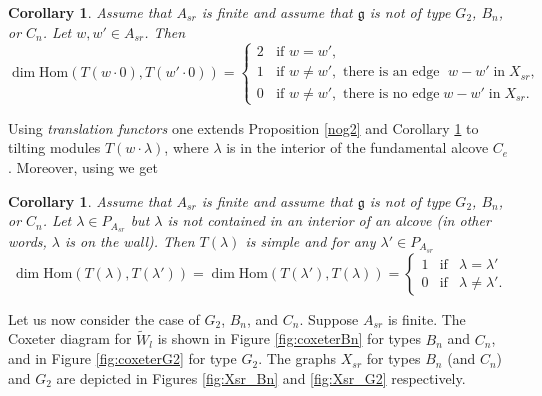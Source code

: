 \documentclass{amsart}
\newtheorem{corollary}[theorem]{Corollary}
\theoremstyle{definition}
\newcommand{\g}{\mathfrak{g}}
\newcommand{\Hom}{\mathrm{Hom}}
\numberwithin{equation}{section}
\begin{document}
\begin{corollary}\label{nog22}
Assume that $A_{sr}$ is finite and assume that $\g$ is not of type $G_2$, $B_n$, or $C_n$. 
Let $w,w'\in A_{sr}$. Then 
$$\dim \Hom(T(w\cdot 0), T( w'\cdot 0))=\begin{cases} 2 \;\; \mbox{   if } w=w',\\ 
1 \;\; \mbox{ if } w\ne w',
\mbox{ there is an edge }\; w-w'\; \mbox{in}\; X_{sr},\\
0 \;\; \mbox{ if } w\ne w',
\mbox{ there is no edge}\; w-w'\; \mbox{in}\; X_{sr}.\end{cases}
$$
\end{corollary}

Using {\em translation functors} one extends Proposition \ref{nog2} and Corollary \ref{nog22} 
to tilting modules $T(w\cdot \lambda)$, where $\lambda$ is in the interior of the fundamental 
alcove $C_e$. Moreover, using \cite[7.3.2]{So1} we get 

\begin{corollary}\label{nog222}
Assume that $A_{sr}$ is finite and assume that $\g$ is not of type $G_2$, $B_n$, or $C_n$. Let $\lambda \in P_{A_{sr}}$
but $\lambda$ is not contained in an interior of an alcove (in other words, $\lambda$ is on the wall). Then $T(\lambda)$ is simple and for any $\lambda' \in P_{A_{sr}}$ 
$$\dim \Hom(T(\lambda), T(\lambda'))=\dim \Hom(T(\lambda'),T(\lambda))=\left\{ \begin{array}{ccc} 1&\mbox{if}&\lambda=\lambda'\\ 0&\mbox{if}&\lambda \ne \lambda'. \end{array}\right.
$$
\end{corollary}



Let us now consider the case of $G_2$, $B_n$, and $C_n$. Suppose $A_{sr}$ is finite. The Coxeter diagram for $\tilde W_l$ is shown in Figure \ref{fig:coxeterBn} for types $B_n$ and $C_n$, and in Figure \ref{fig:coxeterG2} for type $G_2$. The graphs $X_{sr}$ for types $B_n$ (and $C_n$) and $G_2$ are depicted in Figures \ref{fig:Xsr_Bn} and \ref{fig:Xsr_G2} respectively.
\end{document}
